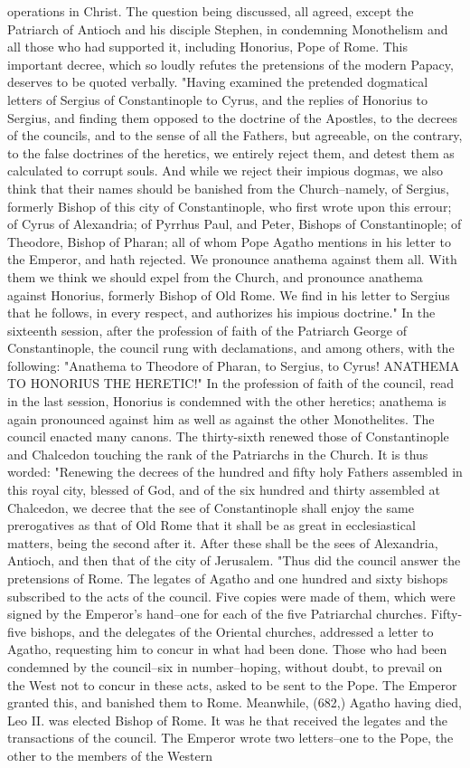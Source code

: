 operations in Christ. The question being discussed, all agreed, except the Patriarch of Antioch and his disciple Stephen, in condemning Monothelism and all those who had supported it, including Honorius, Pope of Rome. This important decree, which so loudly refutes the pretensions of the modern Papacy, deserves to be quoted verbally. "Having examined the pretended dogmatical letters of Sergius of Constantinople to Cyrus, and the replies of Honorius to Sergius, and finding them opposed to the doctrine of the Apostles, to the decrees of the councils, and to the sense of all the Fathers, but agreeable, on the contrary, to the false doctrines of the heretics, we entirely reject them, and detest them as calculated to corrupt souls. And while we reject their impious dogmas, we also think that their names should be banished from the Church--namely, of Sergius, formerly Bishop of this city of Constantinople, who first wrote upon this errour; of Cyrus of Alexandria; of Pyrrhus Paul, and Peter, Bishops of Constantinople; of Theodore, Bishop of Pharan; all of whom Pope Agatho mentions in his letter to the Emperor, and hath rejected. We pronounce anathema against them all. With them we think we should expel from the Church, and pronounce anathema against Honorius, formerly Bishop of Old Rome. We find in his letter to Sergius that he follows, in every respect, and authorizes his impious doctrine." In the sixteenth session, after the profession of faith of the Patriarch George of Constantinople, the council rung with declamations, and among others, with the following: "Anathema to Theodore of Pharan, to Sergius, to Cyrus! ANATHEMA TO HONORIUS THE HERETIC!" In the profession of faith of the council, read in the last session, Honorius is condemned with the other heretics; anathema is again pronounced against him as well as against the other Monothelites. The council enacted many canons. The thirty-sixth renewed those of Constantinople and Chalcedon touching the rank of the Patriarchs in the Church. It is thus worded: "Renewing the decrees of the hundred and fifty holy Fathers assembled in this royal city, blessed of God, and of the six hundred and thirty assembled at Chalcedon, we decree that the see of Constantinople shall enjoy the same prerogatives as that of Old Rome that it shall be as great in ecclesiastical matters, being the second after it. After these shall be the sees of Alexandria, Antioch, and then that of the city of Jerusalem. "Thus did the council answer the pretensions of Rome. The legates of Agatho and one hundred and sixty bishops subscribed to the acts of the council. Five copies were made of them, which were signed by the Emperor's hand--one for each of the five Patriarchal churches. Fifty-five bishops, and the delegates of the Oriental churches, addressed a letter to Agatho, requesting him to concur in what had been done. Those who had been condemned by the council--six in number--hoping, without doubt, to prevail on the West not to concur in these acts, asked to be sent to the Pope. The Emperor granted this, and banished them to Rome. Meanwhile, (682,) Agatho having died, Leo II. was elected Bishop of Rome. It was he that received the legates and the transactions of the council. The Emperor wrote two letters--one to the Pope, the other to the members of the Western 